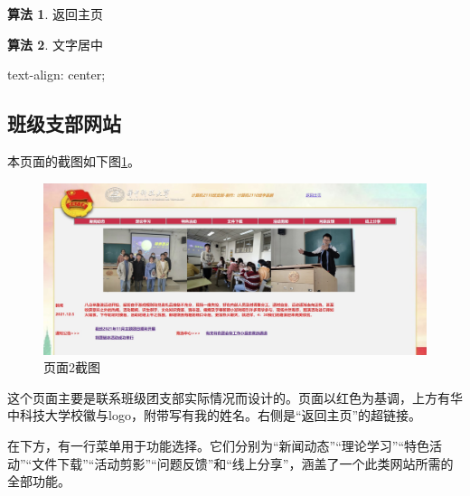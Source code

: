 \documentclass[supercite]{Experimental_Report}
\theoremstyle{definition}
\newtheorem{alg}{算法}[section]
\begin{document}
	\begin{shaded*}\begin{alg}{返回主页}
			\label{alg:2}
	\end{alg}\end{shaded*}

    \begin{shaded*}\begin{alg}{文字居中}
    		\label{alg:3}
    		\begin{algorithmic}
    			text-align: center;
    		\end{algorithmic}
    \end{alg}\end{shaded*}
	
	\subsection{班级支部网站}
	
	本页面的截图如下图\ref{fig3-3}。

	\begin{figure}[htb]
		\begin{center}
			\includegraphics[scale=0.40]{images/3-3.jpg}
			\caption{页面2截图}
			\label{fig3-3}
			\end{center}
	\end{figure}
	
	这个页面主要是联系班级团支部实际情况而设计的。页面以红色为基调，上方有华中科技大学校徽与logo，附带写有我的姓名。右侧是“返回主页”的超链接。
	
	在下方，有一行菜单用于功能选择。它们分别为“新闻动态”“理论学习”“特色活动”“文件下载”“活动剪影”“问题反馈”和“线上分享”，涵盖了一个此类网站所需的全部功能。
	
\end{document}
